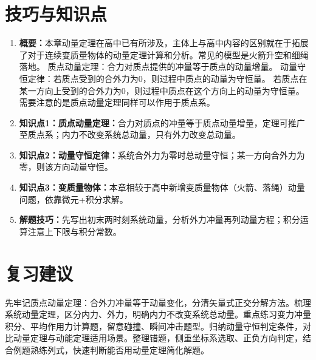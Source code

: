 \documentclass[11pt,a4paper]{ctexart}
\begin{document}
\section*{技巧与知识点}
\begin{tipBox}
\begin{enumerate}
  \item \textbf{概要：}本章动量定理在高中已有所涉及，主体上与高中内容的区别就在于拓展了对于连续变质量物体的动量定理计算和分析。常见的模型是火箭升空和细绳落地。
质点动量定理：合力对质点提供的冲量等于质点的动量增量。
动量守恒定律：若质点受到的合外力为0，则过程中质点的动量为守恒量。
              若质点在某一方向上受到的合外力为0，则过程中质点在这个方向上的动量为守恒量。
需要注意的是质点动量定理同样可以作用于质点系。

  \item \textbf{知识点1：质点动量定理：}合力对质点的冲量等于质点动量增量，定理可推广至质点系；内力不改变系统总动量，只有外力改变总动量。
  \item \textbf{知识点2：动量守恒定律：}系统合外力为零时总动量守恒；某一方向合外力为零，则该方向动量守恒。
  \item \textbf{知识点3：变质量物体：}本章相较于高中新增变质量物体（火箭、落绳）动量问题，依靠微元+积分求解。
  \item \textbf{解题技巧：}先写出初末两时刻系统动量，分析外力冲量再列动量方程；积分运算注意上下限与积分常数。
\end{enumerate}
\end{tipBox}
\section*{复习建议}
先牢记质点动量定理：合外力冲量等于动量变化，分清矢量式正交分解方法。梳理系统动量定理，区分内力、外力，明确内力不改变系统总动量。重点练习变力冲量积分、平均作用力计算题，留意碰撞、瞬间冲击题型。归纳动量守恒判定条件，对比动量定理与动能定理适用场景。整理错题，侧重坐标系选取、正负方向判定，结合例题熟练列式，快速判断能否用动量定理简化解题。
\end{document}
